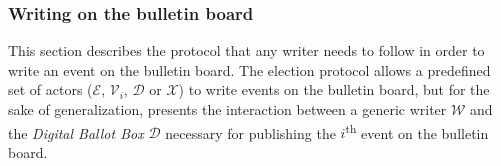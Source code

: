 \subsubsection{Writing on the bulletin board} \label{sec: writing on the bulletin board}
This section describes the protocol that any writer needs to follow in order to write an event on the bulletin board. The election protocol allows a predefined set of actors ($\mathcal{E}$, $\mathcal{V}_i$, $\mathcal{D}$ or $\mathcal{X}$) to write events on the bulletin board, but for the sake of generalization,  presents the interaction between a generic writer $\mathcal{W}$ and the \textit{Digital Ballot Box} $\mathcal{D}$ necessary for publishing the $i$\textsuperscript{th} event on the bulletin board.

\begin{figure}[ht]
    \centering
\end{figure}
